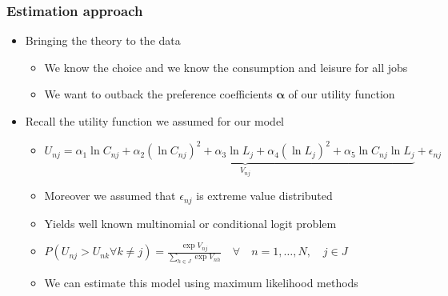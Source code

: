 \documentclass[handout,intlimits]{beamer}
\def\litc#1{\textcolor{med-gray}{\tiny\citep{#1}}}
\def\blue#1{\textcolor{zewblue}{#1}}
\def\vect#1{\mathbold{#1}}
\begin{document}
\begin{frame}
\frametitle{Estimation approach}
\begin{itemize}
	\item \blue{Bringing the theory to the data}
	\begin{itemize}
		\item We know the choice and we know the consumption and leisure for all jobs
		\smallskip
		\item We want to outback the preference coefficients $\vect{\alpha}$ of our utility function
	\end{itemize}
	\bigskip
	\item \blue{Recall the utility function we assumed for our model}
	\begin{itemize}
		\item $U_{nj} = \underbrace{\alpha_1 \ln C_{nj} + \alpha_2 (\ln C_{nj})^2 + \alpha_3 \ln L_j + \alpha_4 (\ln L_j)^2 + \alpha_5  \ln C_{nj} \ln L_j}_{V_{nj}} + \epsilon_{nj}$
		\smallskip
		\item Moreover we assumed that $\epsilon_{nj}$ is extreme value distributed
		\smallskip
		\item Yields well known multinomial or conditional logit problem \litc{mcfadden_clogit_1974}
		\smallskip
		\item $P\left(U_{nj}>U_{nk}\forall k\neq j\right) = \frac{\exp V_{nj}}{\sum_{h\in J}\exp V_{nh}} \quad \forall \quad n=1,\dots,N, \quad j\in J$
		\smallskip
		\item We can estimate this model using maximum likelihood methods
	\end{itemize}
\end{itemize}
\end{frame}
\end{document}
